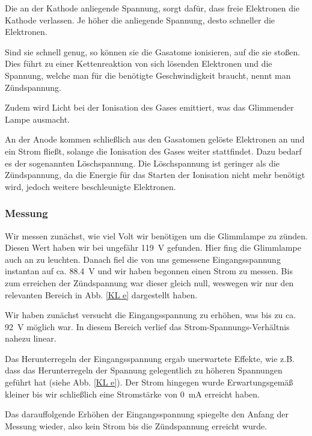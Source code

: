 \documentclass[11pt,a4paper,titlepage, ngerman]{article}
\begin{document}
				Die an der Kathode anliegende Spannung, sorgt dafür, dass freie Elektronen die Kathode verlassen. Je höher die anliegende Spannung, desto schneller die Elektronen. 
				
				Sind sie schnell genug, so können sie die Gasatome ionisieren, auf die sie stoßen. Dies führt zu einer Kettenreaktion von sich lösenden Elektronen und die Spannung, welche man für die benötigte Geschwindigkeit braucht, nennt man Zündspannung. 
				
				Zudem wird Licht bei der Ionisation des Gases emittiert, was das \glqq Glimmen\grqq der Lampe ausmacht.
				
				An der Anode kommen schließlich aus den Gasatomen gelöste Elektronen an und ein Strom fließt, solange die Ionisation des Gases weiter stattfindet. Dazu bedarf es der sogenannten Löschspannung.
				Die Löschspannung ist geringer als die Zündspannung, da die Energie für das Starten der Ionisation nicht mehr benötigt wird, jedoch weitere beschleunigte Elektronen.
					
			\subsubsection*{Messung}
			
				Wir messen zunächst, wie viel Volt wir benötigen um die Glimmlampe zu zünden. Diesen Wert haben wir bei ungefähr \SI{119}{\V} gefunden.
				Hier fing die Glimmlampe auch an zu leuchten.
				Danach fiel die von uns gemessene Eingangsspannung instantan auf ca. \SI{88,4}{\V} und wir haben begonnen einen Strom zu messen. Bis zum erreichen der Zündspannung war dieser gleich null, weswegen wir nur den relevanten Bereich in Abb. \ref{KL e} dargestellt haben.
				
				Wir haben zunächst versucht die Eingangsspannung zu erhöhen, was bis zu ca. \SI{92}{\V} möglich war. In diesem Bereich verlief das Strom-Spannungs-Verhältnis nahezu linear.
				
				Das Herunterregeln der Eingangsspannung ergab unerwartete Effekte, wie z.B. dass das Herunterregeln der Spannung gelegentlich zu höheren Spannungen geführt hat (siehe Abb. \ref{KL e}). Der Strom hingegen wurde Erwartungsgemäß kleiner bis wir schließlich eine Stromstärke von \SI{0}{mA} erreicht haben.
				
				Das darauffolgende Erhöhen der Eingangsspannung spiegelte den Anfang der Messung wieder, also kein Strom bis die Zündspannung erreicht wurde. 
			
\end{document}
